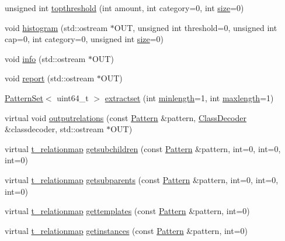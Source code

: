 \begin{DoxyCompactItemize}
\item 
unsigned int \hyperlink{classPatternModel_a1e4c12ee56b5ae88f4a5b140ac6a6a0a}{topthreshold} (int amount, int category=0, int \hyperlink{classPatternModel_a25f387acaf981af9962195bd05b3e7e2}{size}=0)
\item 
void \hyperlink{classPatternModel_a9edf12738542d8d8b0cc9aa06b5a69b2}{histogram} (std\+::ostream $\ast$O\+U\+T, unsigned int threshold=0, unsigned int cap=0, int category=0, unsigned int \hyperlink{classPatternModel_a25f387acaf981af9962195bd05b3e7e2}{size}=0)
\item 
void \hyperlink{classPatternModel_a231e5e4c9ed49764b24718e4269b4256}{info} (std\+::ostream $\ast$O\+U\+T)
\item 
void \hyperlink{classPatternModel_aee8c647241c7ec1a80e088b13e232a06}{report} (std\+::ostream $\ast$O\+U\+T)
\item 
\hyperlink{classPatternSet}{Pattern\+Set}$<$ uint64\+\_\+t $>$ \hyperlink{classPatternModel_a8881489a5a99215499809c6dcbe704e9}{extractset} (int \hyperlink{classPatternModel_a4777ec9b1e76ef3c2ccbc981dad15129}{minlength}=1, int \hyperlink{classPatternModel_ac0d63c6c6ada696e3a247e25df8487ec}{maxlength}=1)
\item 
virtual void \hyperlink{classPatternModel_aa350e235140e580526d381c626355b58}{outputrelations} (const \hyperlink{classPattern}{Pattern} \&pattern, \hyperlink{classClassDecoder}{Class\+Decoder} \&classdecoder, std\+::ostream $\ast$O\+U\+T)
\item 
virtual \hyperlink{patternmodel_8h_a8695a2b10be5a74c827cd6c11bd46fb9}{t\+\_\+relationmap} \hyperlink{classPatternModel_a3b0fa1ea8423db319dfd6f338f7b2b40}{getsubchildren} (const \hyperlink{classPattern}{Pattern} \&pattern, int=0, int=0, int=0)
\item 
virtual \hyperlink{patternmodel_8h_a8695a2b10be5a74c827cd6c11bd46fb9}{t\+\_\+relationmap} \hyperlink{classPatternModel_a5fb7d6ef4e82a300557f2e0350209a6f}{getsubparents} (const \hyperlink{classPattern}{Pattern} \&pattern, int=0, int=0, int=0)
\item 
virtual \hyperlink{patternmodel_8h_a8695a2b10be5a74c827cd6c11bd46fb9}{t\+\_\+relationmap} \hyperlink{classPatternModel_a997f4cfc3e65fb218097061f9d4429ca}{gettemplates} (const \hyperlink{classPattern}{Pattern} \&pattern, int=0)
\item 
virtual \hyperlink{patternmodel_8h_a8695a2b10be5a74c827cd6c11bd46fb9}{t\+\_\+relationmap} \hyperlink{classPatternModel_a564b582aba0eedacd4b0b6f2fa693f7d}{getinstances} (const \hyperlink{classPattern}{Pattern} \&pattern, int=0)

\end{DoxyCompactItemize}
